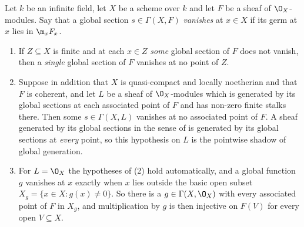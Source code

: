 \begin{lemma}
\label{lem:deg-generic-section}
\leanok
Let $k$ be an infinite field, let $X$ be a scheme over $k$ and let $F$ be a
sheaf of $\O_X$-modules.  Say that a global section $s\in\Gamma(X,F)$
\emph{vanishes} at $x\in X$ if its germ at $x$ lies in $\m_xF_x$.
\begin{enumerate}
  \item If $Z\subseteq X$ is finite and at each $x\in Z$ \emph{some} global
  section of $F$ does not vanish, then a \emph{single} global section of $F$
  vanishes at no point of $Z$.
  \item Suppose in addition that $X$ is quasi-compact and locally noetherian
  and that $F$ is coherent, and let $L$ be a sheaf of $\O_X$-modules which is
  generated by its global sections at each associated point of $F$ and has
  non-zero finite stalks there.  Then some $s\in\Gamma(X,L)$ vanishes at no
  associated point of $F$.  A sheaf generated by its global sections in the
  sense of  is generated by its global sections at
  \emph{every} point, so this hypothesis on $L$ is the pointwise shadow of
  global generation.
  \item For $L=\O_X$ the hypotheses of (2) hold automatically, and a global
  function $g$ vanishes at $x$ exactly when $x$ lies outside the basic open
  subset $X_g=\{x\in X:g(x)\neq0\}$.  So there is a
  $g\in\Gamma(X,\O_X)$ with every associated point of $F$ in $X_g$, and
  multiplication by $g$ is then injective on $F(V)$ for every open
  $V\subseteq X$.
\end{enumerate}
\end{lemma}
